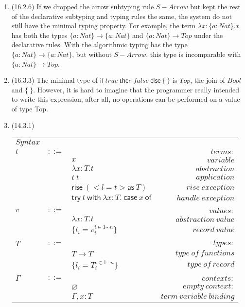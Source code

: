 \documentclass{article}
\begin{document}
\begin{enumerate}
\item (16.2.6) If we dropped the arrow subtyping rule $S-Arrow$ but kept the rest of the declarative subtyping and typing rules the same, the system do not still have the minimal typing property. For example, the term $\lambda x:\{a:Nat\}.x$ has both the types $\{a:Nat\} \to \{a:Nat\}$ and $\{a:Nat\} \to Top$ under the declarative rules. With the algorithmic typing has the type $\{a:Nat\} \to \{a:Nat\}$,  but without $S-Arrow$, this type is incomparable with $\{a:Nat\} \to Top$.
\item (16.3.3) The minimal type of $ \mathsf{if} \ true \ \mathsf {then} \ false \ \mathsf {else} \  \{ \ \}$ is $Top$, the join of $Bool$ and $\{ \ \}$. However, it is hard to imagine that the programmer really intended to write this expression, after all, no operations can be performed on a value of type Top.
\item (14.3.1)

\begin{table}[htbp]
\begin{center}
\begin{tabular}{l c l r}
$Syntax$ &&& \\ 
$t$ & $::=$ & &$terms:$\\ 
&&$x$&$variable$\\ 
&&$\lambda x:T.t$&$abstraction$\\
&&$t \ t$&$application$\\
&&$\mathsf{rise} \ (<l = t> \mathsf{as} \ T)$&$rise \ exception$\\
&&$\mathsf{try} \ t \ \mathsf{with} \ \lambda x:T. \ \mathsf{case} \ x \ \mathsf{of} \ $ & $handle \ exception$\\
&&&\\
$v$ & $::=$ & &$values:$\\
&&$\lambda x:T.t$&$abstraction \ value$\\
&&$\{l_i=v_i^{i \in 1 \cdots n}\}$&$record \ value$\\
&&&\\
$T$&$::=$&&$types:$\\
&&$T \to T$&$type \ of \ functions$\\
&&$\{l_i=T_i^{i \in 1 \cdots n}\}$&$type \ of \ record$\\
&&&\\
$\Gamma$&$::=$&&$contexts:$\\
&&$\varnothing$&$empty \ context:$\\
&&$\Gamma , x:T$&$term \ variable \ binding$\\
\end{tabular}
\end{center}
\end{table}

\end{enumerate}
\end{document}
